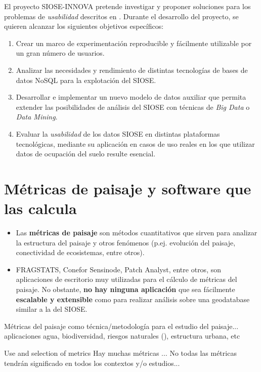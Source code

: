 El proyecto SIOSE-INNOVA pretende investigar y proponer soluciones para los problemas de \textit{usabilidad} descritos en \citet{FernandezVillarino2012}. Durante el desarrollo del proyecto, se quieren alcanzar los siguientes objetivos específicos:
\begin{enumerate}
\item Crear un marco de experimentación reproducible y fácilmente utilizable por un gran número de usuarios.
\item Analizar las necesidades y rendimiento de distintas tecnologías de bases de datos NoSQL para la explotación del SIOSE.
\item Desarrollar e implementar un nuevo modelo de datos auxiliar que permita extender las posibilidades de análisis del SIOSE con técnicas de \textit{Big Data} o \textit{Data Mining}.
\item Evaluar la \textit{usabilidad} de los datos SIOSE en distintas plataformas tecnológicas, mediante su aplicación en casos de uso reales en los que utilizar datos de ocupación del suelo resulte esencial.
\end{enumerate}


\section{Métricas de paisaje y software que las calcula}

\begin{graybox}
\begin{itemize}
\item Las \textbf{métricas de paisaje} son métodos cuantitativos que sirven para analizar la estructura del paisaje y otros fenómenos (p.ej. evolución del paisaje, conectividad de ecosistemas, entre otros).
\item FRAGSTATS, Conefor Sensinode, Patch Analyst, entre otros, son aplicaciones de escritorio muy utilizadas para el cálculo de métricas del paisaje. No obstante, \textbf{no hay ninguna aplicación} que sea fácilmente \textbf{escalable y extensible} como para realizar análisis sobre una geodatabase similar a la del SIOSE.
\end{itemize}
\end{graybox}

Métricas del paisaje como técnica/metodología para el estudio del paisaje... aplicaciones agua, biodiversidad, riesgos naturales (), estructura urbana,  etc  

Use and selection of metrics
Hay muchas métricas ...
No todas las métricas tendrán significado en todos los contextos y/o estudios... \cite{Uuemaa2009} 

